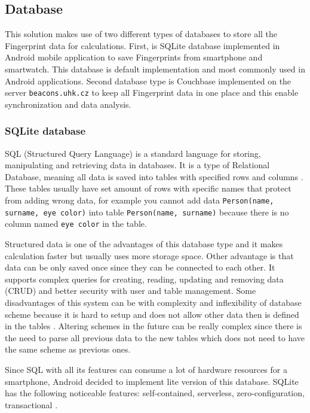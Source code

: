 \subsection{Database}\label{subsec:Database}
This solution makes use of two different types of databases to store all the Fingerprint data for calculations. First, is SQLite database implemented in Android mobile application to save Fingerprints from smartphone and smartwatch. This database is default implementation and most commonly used in Android applications. Second database type is Couchbase implemented on the server \verb|beacons.uhk.cz| to keep all Fingerprint data in one place and this enable synchronization and data analysis.

\subsubsection{SQLite database}\label{subsec:SQLiteDatabase}
SQL (Structured Query Language) is a standard language for storing, manipulating and retrieving data in databases. It is a type of Relational Database, meaning all data is saved into tables with specified rows and columns \cite{WISQLITE}. These tables usually have set amount of rows with specific names that protect from adding wrong data, for example you cannot add data \verb|Person(name, surname, eye color)| into table \verb|Person(name, surname)| because there is no column named \verb|eye color| in the table.

Structured data is one of the advantages of this database type and it makes calculation faster but usually uses more storage space. Other advantage is that data can be only saved once since they can be connected to each other. It supports complex queries for creating, reading, updating and removing data (CRUD) and better security with user and table management. Some disadvantages of this system can be with complexity and inflexibility of database scheme because it is hard to setup and does not allow other data then is defined in the tables \cite{ERDMS}. Altering schemes in the future can be really complex since there is the need to parse all previous data to the new tables which does not need to have the same scheme as previous ones.

Since SQL with all its features can consume a lot of hardware resources for a smartphone, Android decided to implement lite version of this database. SQLite has the following noticeable features: self-contained, serverless, zero-configuration, transactional \cite{WISQLITE}.

